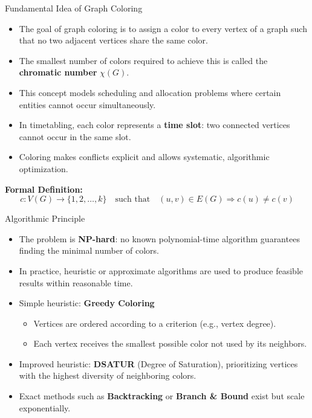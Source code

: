 \documentclass[10pt]{beamer}
\begin{document}
\begin{frame}{Fundamental Idea of Graph Coloring}
    \small
    \begin{itemize}
        \item The goal of graph coloring is to assign a color to every vertex of a graph such that no two adjacent vertices share the same color.
        \item The smallest number of colors required to achieve this is called the \textbf{chromatic number} $\chi(G)$.
        \item This concept models scheduling and allocation problems where certain entities cannot occur simultaneously.
        \item In timetabling, each color represents a \textbf{time slot}: two connected vertices cannot occur in the same slot.
        \item Coloring makes conflicts explicit and allows systematic, algorithmic optimization.
    \end{itemize}

    \vspace{1em}
    \textbf{Formal Definition:}
    \[
        c: V(G) \rightarrow \{1, 2, \dots, k\} \quad \text{such that} \quad (u,v) \in E(G) \Rightarrow c(u) \neq c(v)
    \]
\end{frame}

\begin{frame}{Algorithmic Principle}
    \small
    \begin{itemize}
        \item The problem is \textbf{NP-hard}: no known polynomial-time algorithm guarantees finding the minimal number of colors.
        \item In practice, heuristic or approximate algorithms are used to produce feasible results within reasonable time.
        \item Simple heuristic: \textbf{Greedy Coloring}
        \begin{itemize}
            \item Vertices are ordered according to a criterion (e.g., vertex degree).
            \item Each vertex receives the smallest possible color not used by its neighbors.
        \end{itemize}
        \item Improved heuristic: \textbf{DSATUR} (Degree of Saturation), prioritizing vertices with the highest diversity of neighboring colors.
        \item Exact methods such as \textbf{Backtracking} or \textbf{Branch \& Bound} exist but scale exponentially.
    \end{itemize}
\end{frame}
\end{document}
